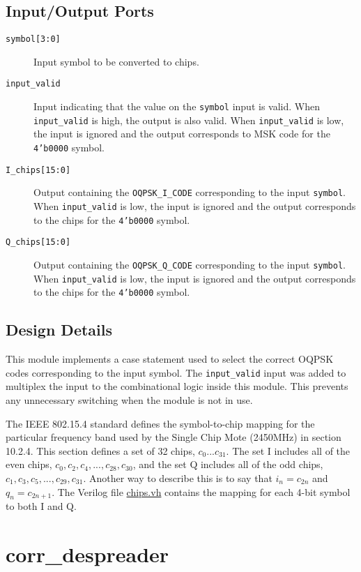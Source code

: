 \subsection{Input/Output Ports}
\begin{description}
	\item[\texttt{symbol[3:0]}] Input symbol to be converted to chips.
	\item[\texttt{input\_valid}] Input indicating that the value on the \texttt{symbol} input is valid. When \texttt{input\_valid} is high, the output is also valid. When \texttt{input\_valid} is low, the input is ignored and the output corresponds to MSK code for the \texttt{4'b0000} symbol.
	\item[\texttt{I\_chips[15:0]}] Output containing the \texttt{OQPSK\_I\_CODE} corresponding to the input \texttt{symbol}. When \texttt{input\_valid} is low, the input is ignored and the output corresponds to the chips for the \texttt{4'b0000} symbol.
	\item[\texttt{Q\_chips[15:0]}] Output containing the \texttt{OQPSK\_Q\_CODE} corresponding to the input \texttt{symbol}. When \texttt{input\_valid} is low, the input is ignored and the output corresponds to the chips for the \texttt{4'b0000} symbol.
\end{description}

\subsection{Design Details}
This module implements a case statement used to select the correct OQPSK codes corresponding to the input symbol. The \texttt{input\_valid} input was added to multiplex the input to the combinational logic inside this module. This prevents any unnecessary switching when the module is not in use.

The IEEE 802.15.4 standard \cite{15-4-standard} defines the symbol-to-chip mapping for the particular frequency band used by the Single Chip Mote (2450MHz) in section 10.2.4. This section defines a set of 32 chips, $c_0...c_{31}$. The set I includes all of the even chips, $c_0,c_2,c_4,...,c_{28},c_{30}$, and the set Q includes all of the odd chips, $c_1,c_3,c_5,...,c_{29},c_{31}$. Another way to describe this is to say that $i_n=c_{2n}$ and $q_n=c_{2n+1}$. The Verilog file \url{chips.vh} contains the mapping for each 4-bit symbol to both I and Q.

\section{corr\_despreader} \label{corr-despreader}
